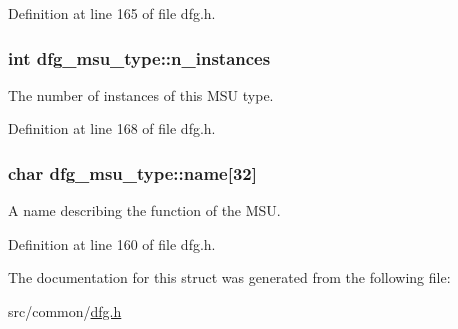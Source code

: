 Definition at line 165 of file dfg.\-h.

\hypertarget{structdfg__msu__type_ae98668b711040cd8cb5d537bb9a3f0cd}{
\subsubsection[{n\-\_\-instances}]{\setlength{\rightskip}{0pt plus 5cm}int dfg\-\_\-msu\-\_\-type\-::n\-\_\-instances}}\label{structdfg__msu__type_ae98668b711040cd8cb5d537bb9a3f0cd}


The number of instances of this M\-S\-U type. 



Definition at line 168 of file dfg.\-h.

\hypertarget{structdfg__msu__type_a59f34013c4d7464817de4fd3c9bebec9}{
\subsubsection[{name}]{\setlength{\rightskip}{0pt plus 5cm}char dfg\-\_\-msu\-\_\-type\-::name\mbox{[}32\mbox{]}}}\label{structdfg__msu__type_a59f34013c4d7464817de4fd3c9bebec9}


A name describing the function of the M\-S\-U. 



Definition at line 160 of file dfg.\-h.



The documentation for this struct was generated from the following file\-:\begin{DoxyCompactItemize}
\item 
src/common/\hyperlink{dfg_8h}{dfg.\-h}\end{DoxyCompactItemize}
